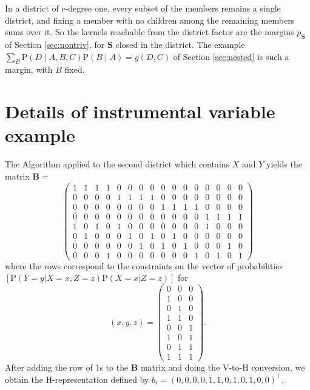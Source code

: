 \documentclass[12pt]{article}
\def\Pr{{\mathrm{P}}}
\newcommand{\bS}{\boldsymbol{S}}
\begin{document}
In a district of c-degree one, every subset of the members remains a single district, and fixing a member with no children among the remaining members sums over it. So the kernels reachable from the district factor are the margins $p_{\bS}$ of Section \ref{sec:nontriv}, for $\bS$ closed in the district. The example $\sum_B \Pr(D \mid A, B, C)\Pr(B \mid A) = g(D, C)$ of Section \ref{sec:nested} is such a margin, with $B$ fixed.

\section{Details of instrumental variable example} \label{appendix:iv}

The Algorithm applied to the second district which contains $X$ and $Y$ yields the matrix $\boldsymbol{B}=$
\[
\begin{pmatrix}
 1 & 1 & 1 & 1 & 0 & 0 & 0 & 0 & 0 & 0 & 0 & 0 & 0 & 0 & 0 & 0 \\ 
 0 & 0 & 0 & 0 & 1 & 1 & 1 & 1 & 0 & 0 & 0 & 0 & 0 & 0 & 0 & 0 \\ 
 0 & 0 & 0 & 0 & 0 & 0 & 0 & 0 & 1 & 1 & 1 & 1 & 0 & 0 & 0 & 0 \\ 
 0 & 0 & 0 & 0 & 0 & 0 & 0 & 0 & 0 & 0 & 0 & 0 & 1 & 1 & 1 & 1 \\ 
 1 & 0 & 1 & 0 & 1 & 0 & 0 & 0 & 0 & 0 & 0 & 0 & 1 & 0 & 0 & 0 \\ 
 0 & 1 & 0 & 0 & 0 & 1 & 0 & 1 & 0 & 1 & 0 & 0 & 0 & 0 & 0 & 0 \\ 
 0 & 0 & 0 & 0 & 0 & 0 & 1 & 0 & 1 & 0 & 1 & 0 & 0 & 0 & 1 & 0 \\ 
 0 & 0 & 0 & 1 & 0 & 0 & 0 & 0 & 0 & 0 & 0 & 1 & 0 & 1 & 0 & 1 
\end{pmatrix}
\]
where the rows correspond to the constraints on the vector of probabilities $[\Pr(Y = y | X = x, Z = z) \Pr(X = x | Z = z)]$ for 
\[
(x, y, z) = 
\begin{pmatrix}
0 & 0 & 0 \\ 
 1 & 0 & 0 \\ 
 0 & 1 & 0 \\ 
 1 & 1 & 0 \\ 
 0 & 0 & 1 \\ 
 1 & 0 & 1 \\ 
 0 & 1 & 1 \\ 
 1 & 1 & 1 
\end{pmatrix}.
\]
After adding the row of 1s to the $\boldsymbol{B}$ matrix and doing the V-to-H conversion, we obtain the H-representation defined by $b_i = (0, 0, 0, 0, 1, 1, 0, 1, 0, 1, 0, 0)^\top$,
\end{document}
